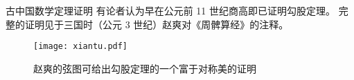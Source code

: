 \begin{frame}{古中国数学}{定理证明}
有论者认为早在公元前 11 世纪商高即已证明勾股定理\cite{quanjing}。
完整的证明见于三国时（公元 3 世纪）赵爽对《周髀算经》的注释。
\begin{figure}
\centering
\texttt{[image: xiantu.pdf]}
\caption{赵爽的弦图可给出勾股定理的一个富于对称美的证明}
\end{figure}
\end{frame}
